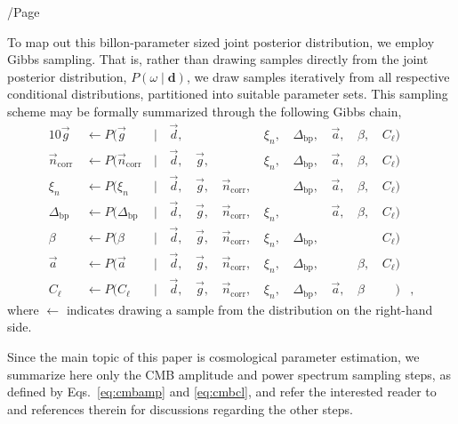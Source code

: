 /Page\documentclass[twocolumn]{aa}
\renewcommand{\d}[0]{\vec{d}}
\newcommand{\n}[0]{\vec{n}}
\renewcommand{\a}[0]{\vec{a}}
\newcommand{\g}[0]{\vec{g}}
\newcommand{\Dbp}[0]{\Delta_{\mathrm{bp}}}
\begin{document}
To map out this billon-parameter sized joint posterior distribution,
we employ Gibbs sampling. That is, rather than drawing samples
directly from the joint posterior distribution, $P(\omega
\mid\mathbf{d})$, we draw samples iteratively from all respective
conditional distributions, partitioned into suitable parameter sets. This sampling scheme may be formally
summarized through the following Gibbs chain,
\begin{alignat}{10}
\g &\,\leftarrow P(\g&\,\mid &\,\d,&\, & &\,\xi_n, &\,\Dbp, &\,\a, &\,\beta, &\,C_{\ell})\\
\n_{\mathrm{corr}} &\,\leftarrow P(\n_{\mathrm{corr}}&\,\mid &\,\d, &\,\g, &\,&\,\xi_n,
&\,\Dbp, &\,\a, &\,\beta, &\,C_{\ell})\\
\xi_n &\,\leftarrow P(\xi_n&\,\mid &\,\d, &\,\g, &\,\n_{\mathrm{corr}}, &\,
&\,\Dbp, &\,\a, &\,\beta, &\,C_{\ell})\\
\Dbp &\,\leftarrow P(\Dbp&\,\mid &\,\d, &\,\g, &\,\n_{\mathrm{corr}}, &\,\xi_n,
&\,&\,\a, &\,\beta, &\,C_{\ell})\\
\beta &\,\leftarrow P(\beta&\,\mid &\,\d, &\,\g, &\,\n_{\mathrm{corr}}, &\,\xi_n,
&\,\Dbp, & &\,&\,C_{\ell})\\\label{eq:cmbamp}
\a &\,\leftarrow P(\a&\,\mid &\,\d, &\,\g, &\,\n_{\mathrm{corr}}, &\,\xi_n,
&\,\Dbp, &\,&\,\beta, &\,C_{\ell})\\\label{eq:cmbcl}
C_{\ell} &\,\leftarrow P(C_{\ell}&\,\mid &\,\d, &\,\g, &\,\n_{\mathrm{corr}}, &\,\xi_n,
&\,\Dbp, &\,\a, &\,\beta&\,\phantom{C_{\ell}})&,
\end{alignat}
where $\leftarrow$ indicates drawing a sample from the distribution on
the right-hand side.

Since the main topic of this paper is cosmological parameter
estimation, we summarize here only the CMB amplitude and power
spectrum sampling steps, as defined by Eqs.~\eqref{eq:cmbamp} and
\eqref{eq:cmbcl}, and refer the interested reader to \citet{bp01} and
references therein for discussions regarding the other steps.
\end{document}
